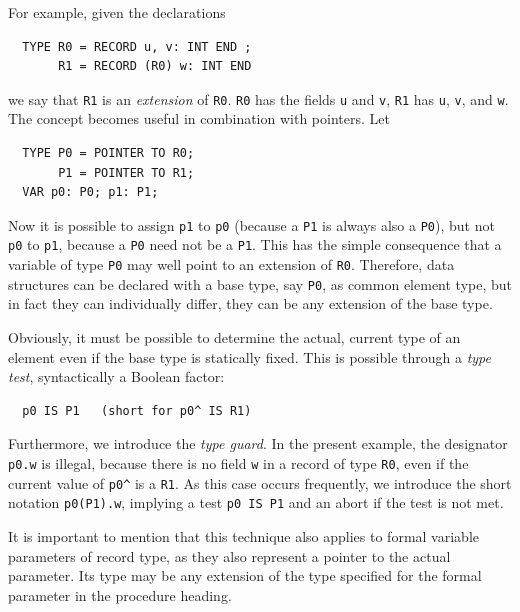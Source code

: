 For example, given the declarations
\begin{verbatim}
  TYPE R0 = RECORD u, v: INT END ;
       R1 = RECORD (R0) w: INT END
\end{verbatim}

we say that \verb|R1| is an \emph{extension} of \verb|R0|. \verb|R0| has the fields \verb|u| and
\verb|v|, \verb|R1| has \verb|u|, \verb|v|, and \verb|w|. The concept becomes useful in combination
with pointers. Let
\begin{verbatim}
  TYPE P0 = POINTER TO R0;
       P1 = POINTER TO R1;
  VAR p0: P0; p1: P1;
\end{verbatim}

Now it is possible to assign \verb|p1| to \verb|p0| (because a \verb|P1| is always also a \verb|P0|),
but not \verb|p0| to \verb|p1|, because a \verb|P0| need not be a \verb|P1|. This has the simple
consequence that a variable of type \verb|P0| may well point to an extension of \verb|R0|. Therefore,
data structures can be declared with a base type, say \verb|P0|, as common element type, but in fact
they can individually differ, they can be any extension of the base type.

Obviously, it must be possible to determine the actual, current type of an element even if the base
type is statically fixed. This is possible through a \emph{type test}, syntactically a Boolean factor:
\begin{verbatim}
  p0 IS P1   (short for p0^ IS R1)
\end{verbatim}

Furthermore, we introduce the \emph{type guard}. In the present example, the designator \verb|p0.w|
is illegal, because there is no field \verb|w| in a record of type \verb|R0|, even if the current value
of \verb|p0^| is a \verb|R1|. As this case occurs frequently, we introduce the short notation
\verb|p0(P1).w|, implying a test \verb|p0 IS P1| and an abort if the test is not met.

It is important to mention that this technique also applies to formal variable parameters of record
type, as they also represent a pointer to the actual parameter. Its type may be any extension of the
type specified for the formal parameter in the procedure heading.

